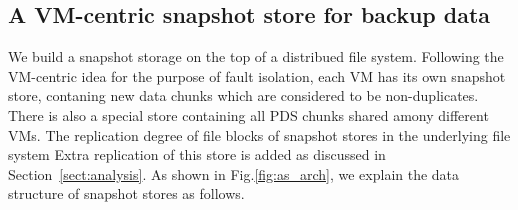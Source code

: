 



\subsection{A VM-centric snapshot store for backup data}

We build a snapshot storage on the top of a distribued file system.
Following the VM-centric idea for the purpose of fault isolation,
each VM has its own snapshot store, contaning new data chunks which are considered
to be non-duplicates.
There is also a special store containing all PDS chunks shared amony different VMs.
The replication degree of file blocks of snapshot stores in the underlying file system
Extra replication of this store is added as discussed in Section~\ref{sect:analysis}.
As shown in Fig.\ref{fig:as_arch}, we explain the data structure of snapshot stores as follows.

